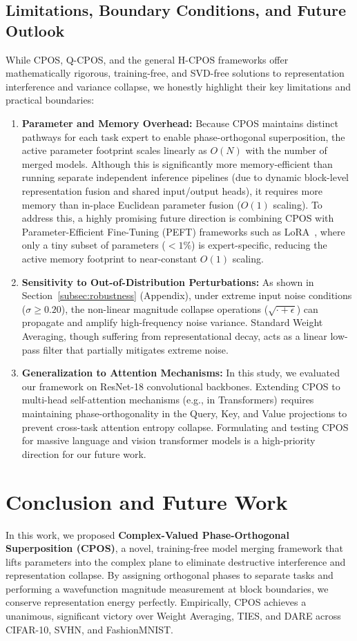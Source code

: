\documentclass{article}
\theoremstyle{plain}
\theoremstyle{definition}
\theoremstyle{remark}
\begin{document}
\subsection{Limitations, Boundary Conditions, and Future Outlook}
While CPOS, Q-CPOS, and the general H-CPOS frameworks offer mathematically rigorous, training-free, and SVD-free solutions to representation interference and variance collapse, we honestly highlight their key limitations and practical boundaries:
\begin{enumerate}
\item \textbf{Parameter and Memory Overhead:} Because CPOS maintains distinct pathways for each task expert to enable phase-orthogonal superposition, the active parameter footprint scales linearly as $O(N)$ with the number of merged models. Although this is significantly more memory-efficient than running separate independent inference pipelines (due to dynamic block-level representation fusion and shared input/output heads), it requires more memory than in-place Euclidean parameter fusion ($O(1)$ scaling). To address this, a highly promising future direction is combining CPOS with Parameter-Efficient Fine-Tuning (PEFT) frameworks such as LoRA~\cite{hu2021lora}, where only a tiny subset of parameters ($<1\%$) is expert-specific, reducing the active memory footprint to near-constant $O(1)$ scaling.
\item \textbf{Sensitivity to Out-of-Distribution Perturbations:} As shown in Section~\ref{subsec:robustness} (Appendix), under extreme input noise conditions ($\sigma \ge 0.20$), the non-linear magnitude collapse operations ($\sqrt{\cdot + \epsilon}$) can propagate and amplify high-frequency noise variance. Standard Weight Averaging, though suffering from representational decay, acts as a linear low-pass filter that partially mitigates extreme noise.
\item \textbf{Generalization to Attention Mechanisms:} In this study, we evaluated our framework on ResNet-18 convolutional backbones. Extending CPOS to multi-head self-attention mechanisms (e.g., in Transformers) requires maintaining phase-orthogonality in the Query, Key, and Value projections to prevent cross-task attention entropy collapse. Formulating and testing CPOS for massive language and vision transformer models is a high-priority direction for our future work.
\end{enumerate}

\section{Conclusion and Future Work}
\label{sec:conclusion}
In this work, we proposed \textbf{Complex-Valued Phase-Orthogonal Superposition (CPOS)}, a novel, training-free model merging framework that lifts parameters into the complex plane to eliminate destructive interference and representation collapse. By assigning orthogonal phases to separate tasks and performing a wavefunction magnitude measurement at block boundaries, we conserve representation energy perfectly. Empirically, CPOS achieves a unanimous, significant victory over Weight Averaging, TIES, and DARE across CIFAR-10, SVHN, and FashionMNIST.
\end{document}
